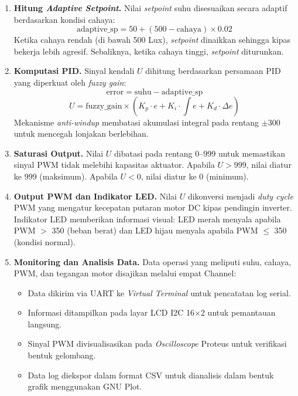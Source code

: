 \documentclass[11pt,a4paper]{article}
\begin{document}
\begin{enumerate}
    \item \textbf{Hitung \textit{Adaptive Setpoint}.} Nilai \textit{setpoint} suhu disesuaikan secara adaptif berdasarkan kondisi cahaya:
    \begin{equation}
        \text{adaptive\_sp} = 50 + (500 - \text{cahaya}) \times 0.02
    \end{equation}
    Ketika cahaya rendah (di bawah 500 Lux), \textit{setpoint} dinaikkan sehingga kipas bekerja lebih agresif. Sebaliknya, ketika cahaya tinggi, \textit{setpoint} diturunkan.

    \item \textbf{Komputasi PID.} Sinyal kendali $U$ dihitung berdasarkan persamaan PID yang diperkuat oleh \textit{fuzzy gain}:
    \begin{equation}
        \text{error} = \text{suhu} - \text{adaptive\_sp}
    \end{equation}
    \begin{equation}
        U = \text{fuzzy\_gain} \times (K_p \cdot e + K_i \cdot \textstyle\int e + K_d \cdot \Delta e)
    \end{equation}
    Mekanisme \textit{anti-windup} membatasi akumulasi integral pada rentang $\pm 300$ untuk mencegah lonjakan berlebihan.

    \item \textbf{Saturasi Output.} Nilai $U$ dibatasi pada rentang 0--999 untuk memastikan sinyal PWM tidak melebihi kapasitas aktuator. Apabila $U > 999$, nilai diatur ke 999 (maksimum). Apabila $U < 0$, nilai diatur ke 0 (minimum).

    \item \textbf{Output PWM dan Indikator LED.} Nilai $U$ dikonversi menjadi \textit{duty cycle} PWM yang mengatur kecepatan putaran motor DC kipas pendingin inverter. Indikator LED memberikan informasi visual: LED merah menyala apabila PWM $>$ 350 (beban berat) dan LED hijau menyala apabila PWM $\leq$ 350 (kondisi normal).

    \item \textbf{Monitoring dan Analisis Data.} Data operasi yang meliputi suhu, cahaya, PWM, dan tegangan motor disajikan melalui empat Channel:
    \begin{itemize}
        \item Data dikirim via UART ke \textit{Virtual Terminal} untuk pencatatan log serial.
        \item Informasi ditampilkan pada layar LCD I2C 16$\times$2 untuk pemantauan langsung.
        \item Sinyal PWM divisualisasikan pada \textit{Oscilloscope} Proteus untuk verifikasi bentuk gelombang.
        \item Data log diekspor dalam format CSV untuk dianalisis dalam bentuk grafik menggunakan GNU Plot.
    \end{itemize}


\end{enumerate}
\end{document}
